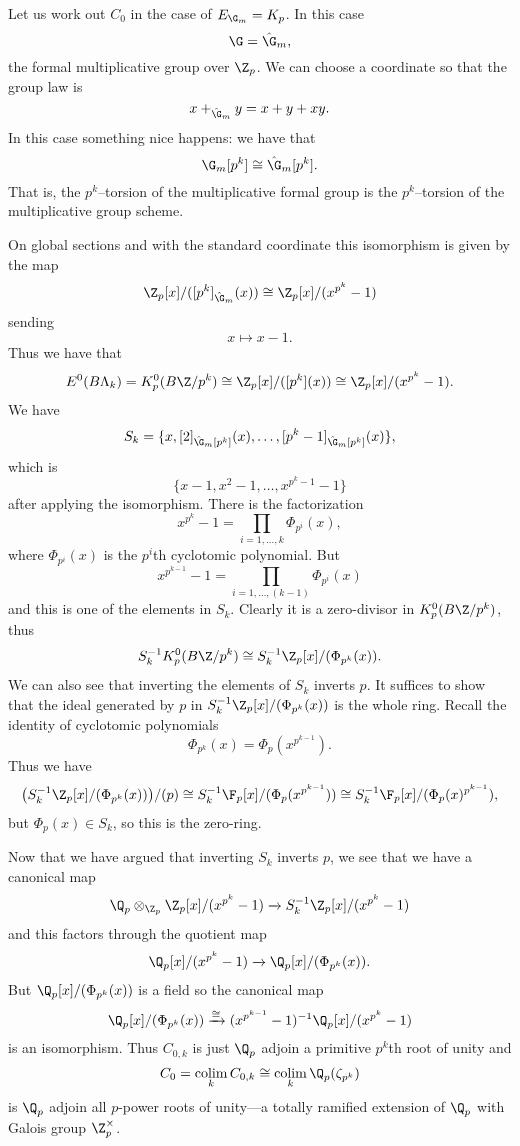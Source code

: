 \begin{example} \label{padicktheory}
Let us work out $C_0$ in the case of $E_{\G_m} = K_p$. In this case 
\[
\G = \hat{\G}_m,
\]
the formal multiplicative group over $\Z_p$. We can choose a coordinate so that the group law is
\[
x+_{\hat{\G}_m}y = x+y+xy.
\] 
In this case something nice happens: we have that
\[
\G_m[p^k] \cong \hat{\G}_m[p^k].
\]
That is, the $p^k$--torsion of the multiplicative formal group is the $p^k$--torsion of the multiplicative group scheme.

On global sections and with the standard coordinate this isomorphism is given by the map
\[
\Z_p[x]/([p^k]_{\hat{\G}_m}(x)) \cong \Z_p[x]/(x^{p^k}-1)
\]
sending
\[
x \mapsto x-1.
\]
Thus we have that 
\[
E^0(B\Lk) = K_{p}^0(B\Z/p^k) \cong \Z_p[x]/([p^k](x)) \cong \Z_p[x]/(x^{p^k}-1).
\]
We have
\[
S_k = \{x,[2]_{\hat{\G}_m[p^k]}(x),\ldots, [p^k-1]_{\hat{\G}_m[p^k]}(x)\},
\]
which is
\[
\{x-1,x^2-1, \ldots, x^{p^k-1}-1\}
\]
after applying the isomorphism.
There is the factorization
\[
x^{p^k}-1 = \prod_{i=1,\ldots,k}\Phi_{p^i}(x),
\]
where $\Phi_{p^i}(x)$ is the $p^i$th cyclotomic polynomial. But
\[
x^{p^{k-1}}-1 = \prod_{i=1,\ldots,(k-1)}\Phi_{p^i}(x)
\]
and this is one of the elements in $S_k$. Clearly it is a zero-divisor in $K_{p}^0(B\Z/p^k)$, thus
\[
S_{k}^{-1}K_{p}^0(B\Z/p^k) \cong S_{k}^{-1}\Z_p[x]/(\Phi_{p^k}(x)).
\]
We can also see that inverting the elements of $S_{k}$ inverts $p$. It suffices to show that the ideal generated by $p$ in $S_{k}^{-1}\Z_p[x]/(\Phi_{p^k}(x))$ is the whole ring. Recall the identity of cyclotomic polynomials 
\[
\Phi_{p^k}(x) = \Phi_p(x^{p^{k-1}}).
\]
Thus we have
\[
\big ( S_{k}^{-1}\Z_p[x]/(\Phi_{p^k}(x)) \big )/(p) \cong S_{k}^{-1}\F_p[x]/(\Phi_{p}(x^{p^{k-1}})) \cong S_{k}^{-1}\F_p[x]/(\Phi_{p}(x)^{p^{k-1}}),
\]
but $\Phi_{p}(x) \in S_k$, so this is the zero-ring.

Now that we have argued that inverting $S_k$ inverts $p$, we see that we have a canonical map
\[
\Q_p \otimes_{\Z_p} \Z_p[x]/(x^{p^k}-1) \xrightarrow{} S_{k}^{-1}\Z_p[x]/(x^{p^k}-1) 
\]
and this factors through the quotient map
\[
\Q_p[x]/(x^{p^k}-1) \xrightarrow{} \Q_p[x]/(\Phi_{p^k}(x)).
\]
But $\Q_p[x]/(\Phi_{p^k}(x))$ is a field so the canonical map
\[
\Q_p[x]/(\Phi_{p^k}(x)) \xrightarrow{\cong} (x^{p^{k-1}}-1)^{-1}\Q_p[x]/(x^{p^k}-1)
\]
is an isomorphism. Thus $C_{0,k}$ is just $\Q_p$ adjoin a primitive $p^k$th root of unity and
\[
C_0 = \colim_k C_{0,k} \cong \colim_k \Q_p(\zeta_{p^k})
\]
is $\Q_p$ adjoin all $p$-power roots of unity---a totally ramified extension of $\Q_p$ with Galois group $\Z_{p}^{\times}$.
\end{example}

